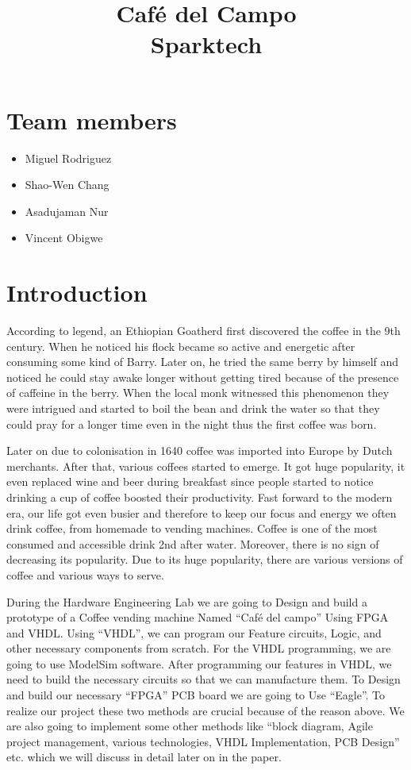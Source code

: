 \documentclass[12pt]{article}
\begin{document}
\title{\textbf{Café del Campo} \\Sparktech}
\maketitle

\section{Team members}
\begin{itemize}
\item Miguel Rodriguez
\item Shao-Wen Chang
\item Asadujaman Nur
\item Vincent Obigwe
\end{itemize}

\section{Introduction}

According to legend, an Ethiopian Goatherd first discovered the coffee in the 9th century. When he noticed his flock became so active and energetic after consuming some kind of Barry. Later on, he tried the same berry by himself and noticed he could stay awake longer without getting tired because of the presence of caffeine in the berry.  When the local monk witnessed this phenomenon they were intrigued and started to boil the bean and drink the water so that they could pray for a longer time even in the night thus the first coffee was born.

Later on due to colonisation in 1640 coffee was imported into Europe by Dutch merchants. After that, various coffees started to emerge. It got huge popularity, it even replaced wine and beer during breakfast since people started to notice drinking a cup of coffee boosted their productivity. Fast forward to the modern era, our life got even busier and therefore to keep our focus and energy we often drink coffee, from homemade to vending machines. Coffee is one of the most consumed and accessible drink 2nd after water. Moreover, there is no sign of decreasing its popularity. Due to its huge popularity, there are various versions of coffee and various ways to serve.

During the Hardware Engineering Lab we are going to Design and build a prototype of a Coffee vending machine Named “Café del campo” Using FPGA and VHDL. Using “VHDL”, we can program our Feature circuits, Logic, and other necessary components from scratch. For the VHDL programming, we are going to use ModelSim software. After programming our features in VHDL, we need to build the necessary circuits so that we can manufacture them. To Design and build our necessary “FPGA” PCB board we are going to Use “Eagle”. To realize our project these two methods are crucial because of the reason above. We are also going to implement some other methods  like “block diagram, Agile project management, various technologies, VHDL Implementation, PCB Design” etc. which we will discuss in detail later on in the paper.
\end{document}
